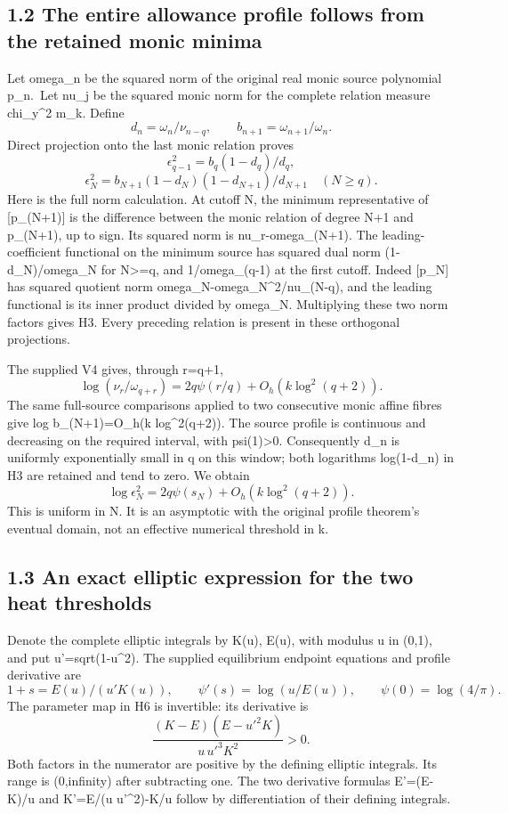 \subsection{1.2 The entire allowance profile follows from the retained monic minima}\label{the-entire-allowance-profile-follows-from-the-retained-monic-minima}

Let omega\_n be the squared norm of the original real monic source polynomial p\_n.~Let nu\_j be the squared monic norm for the complete relation measure chi\_y\^{}2 m\_k. Define \[
 d_n=\omega_n/\nu_{n-q},\qquad b_{n+1}=\omega_{n+1}/\omega_n.
\] Direct projection onto the last monic relation proves \[
 \epsilon_{q-1}^2=b_q(1-d_q)/d_q,
\] \[
 \epsilon_N^2=b_{N+1}(1-d_N)(1-d_{N+1})/d_{N+1}\quad(N\ge q).
 \tag{H3}
\] Here is the full norm calculation. At cutoff N, the minimum representative of {[}p\_(N+1){]} is the difference between the monic relation of degree N+1 and p\_(N+1), up to sign. Its squared norm is nu\_r-omega\_(N+1). The leading-coefficient functional on the minimum source has squared dual norm (1-d\_N)/omega\_N for N\textgreater=q, and 1/omega\_(q-1) at the first cutoff. Indeed {[}p\_N{]} has squared quotient norm omega\_N-omega\_N\^{}2/nu\_(N-q), and the leading functional is its inner product divided by omega\_N. Multiplying these two norm factors gives H3. Every preceding relation is present in these orthogonal projections.

The supplied V4 gives, through r=q+1, \[
 \log(\nu_r/\omega_{q+r})=2q\psi(r/q)+O_h(k\log^2(q+2)).
 \tag{H4}
\] The same full-source comparisons applied to two consecutive monic affine fibres give log b\_(N+1)=O\_h(k log\^{}2(q+2)). The source profile is continuous and decreasing on the required interval, with psi(1)\textgreater0. Consequently d\_n is uniformly exponentially small in q on this window; both logarithms log(1-d\_n) in H3 are retained and tend to zero. We obtain \[
 \boxed{\log\epsilon_N^2=2q\psi(s_N)+O_h(k\log^2(q+2)).}
 \tag{H5}
\] This is uniform in N. It is an asymptotic with the original profile theorem's eventual domain, not an effective numerical threshold in k.

\subsection{1.3 An exact elliptic expression for the two heat thresholds}\label{an-exact-elliptic-expression-for-the-two-heat-thresholds}

Denote the complete elliptic integrals by K(u), E(u), with modulus u in (0,1), and put u'=sqrt(1-u\^{}2). The supplied equilibrium endpoint equations and profile derivative are \[
 1+s=E(u)/(u'K(u)),\qquad \psi'(s)=\log(u/E(u)),\qquad \psi(0)=\log(4/\pi).
 \tag{H6}
\] The parameter map in H6 is invertible: its derivative is \[
 \frac{(K-E)(E-u'^2K)}{u\,u'^3K^2}>0.
\] Both factors in the numerator are positive by the defining elliptic integrals. Its range is (0,infinity) after subtracting one. The two derivative formulas E'=(E-K)/u and K'=E/(u u'\^{}2)-K/u follow by differentiation of their defining integrals.

